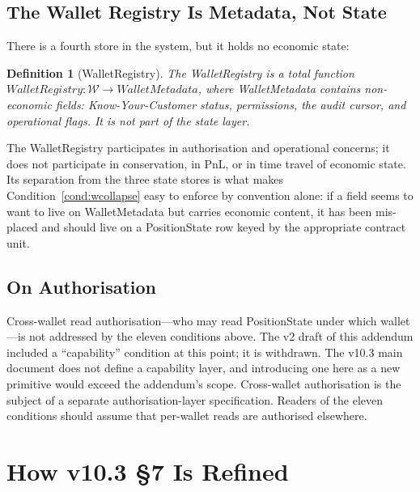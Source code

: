 \documentclass[11pt,a4paper]{article}
\newtheorem{definition}{Definition}[section]
\begin{document}
\subsection{The Wallet Registry Is Metadata, Not State}
\label{sec:walletregistry}

There is a fourth store in the system, but it holds no economic state:

\begin{definition}[WalletRegistry]
The \emph{WalletRegistry} is a total function $\textit{WalletRegistry} : \mathcal{W} \to \textit{WalletMetadata}$, where WalletMetadata contains non-economic fields: Know-Your-Customer status, permissions, the audit cursor, and operational flags. It is not part of the state layer.
\end{definition}

\noindent The WalletRegistry participates in authorisation and operational concerns; it does not participate in conservation, in PnL, or in time travel of economic state. Its separation from the three state stores is what makes Condition~\ref{cond:wcollapse} easy to enforce by convention alone: if a field seems to want to live on WalletMetadata but carries economic content, it has been mis-placed and should live on a PositionState row keyed by the appropriate contract unit.

\subsection{On Authorisation}

Cross-wallet read authorisation---who may read PositionState under which wallet---is not addressed by the eleven conditions above. The v2 draft of this addendum included a ``capability'' condition at this point; it is withdrawn. The v10.3 main document does not define a capability layer, and introducing one here as a new primitive would exceed the addendum's scope. Cross-wallet authorisation is the subject of a separate authorisation-layer specification. Readers of the eleven conditions should assume that per-wallet reads are authorised elsewhere.

\clearpage
\section{How v10.3 \S 7 Is Refined}
\label{sec:refinement}
\end{document}
